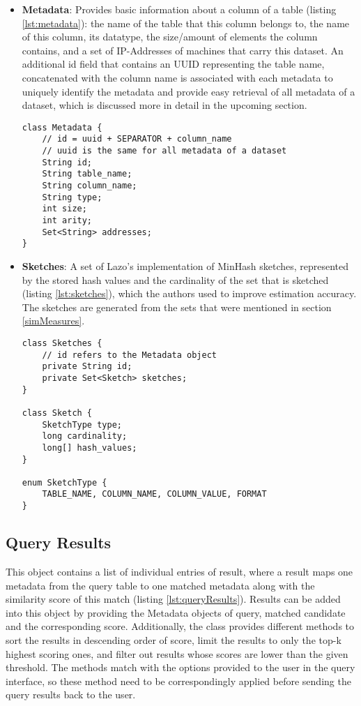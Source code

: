 \begin{itemize}
    \item \textbf{Metadata}: Provides basic information about a column of a table (listing \ref{lst:metadata}): the name of the table that this column belongs to, the name of this column, its datatype, the size/amount of elements the column contains, and a set of IP-Addresses of machines that carry this dataset. An additional id field that contains an UUID representing the table name, concatenated with the column name is associated with each metadata to uniquely identify the metadata and provide easy retrieval of all metadata of a dataset, which is discussed more in detail in the upcoming section.
    \begin{lstlisting}[caption={The metadata object}, label=lst:metadata]
class Metadata {
    // id = uuid + SEPARATOR + column_name
    // uuid is the same for all metadata of a dataset
    String id;
    String table_name;
    String column_name;
    String type;
    int size;
    int arity;
    Set<String> addresses;
}
    \end{lstlisting}
    \item \textbf{Sketches}: A set of Lazo's implementation of MinHash sketches, represented by the stored hash values and the cardinality of the set that is sketched (listing \ref{lst:sketches}), which the authors used to improve estimation accuracy. The sketches are generated from the sets that were mentioned in section \ref{simMeasures}.

\begin{lstlisting}[caption={The sketches object}, label=lst:sketches]
class Sketches {
    // id refers to the Metadata object
    private String id;
    private Set<Sketch> sketches;
}

class Sketch {
    SketchType type;
    long cardinality;
    long[] hash_values;
}

enum SketchType {
    TABLE_NAME, COLUMN_NAME, COLUMN_VALUE, FORMAT
}
    \end{lstlisting}
\end{itemize}

\subsection{Query Results}

This object contains a list of individual entries of result, where a result maps one metadata from the query table to one matched metadata along with the similarity score of this match (listing \ref{lst:queryResults}). Results can be added into this object by providing the Metadata objects of query, matched candidate and the corresponding score. Additionally, the class provides different methods to sort the results in descending order of score, limit the results to only the top-k highest scoring ones, and filter out results whose scores are lower than the given threshold. The methods match with the options provided to the user in the query interface, so these method need to be correspondingly applied before sending the query results back to the user. 

